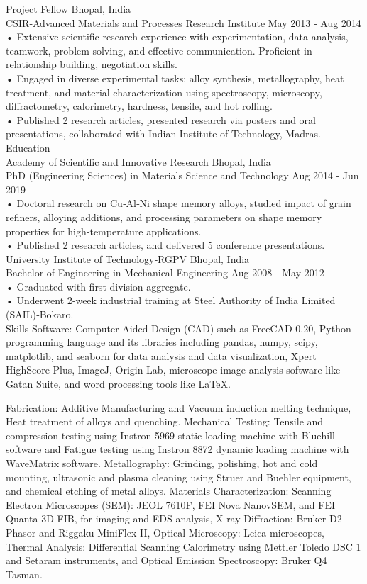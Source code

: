 \documentclass[a4paper]{article}
\begin{document}
Project Fellow Bhopal, India\\
CSIR‑Advanced Materials and Processes Research Institute May 2013 ‑ Aug 2014\\
• Extensive scientific research experience with experimentation, data analysis, teamwork, problem‑solving, and effective
communication. Proficient in relationship building, negotiation skills.\\
• Engaged in diverse experimental tasks: alloy synthesis, metallography, heat treatment, and material characterization
using spectroscopy, microscopy, diffractometry, calorimetry, hardness, tensile, and hot rolling.\\
• Published 2 research articles, presented research via posters and oral presentations, collaborated with Indian Institute
of Technology, Madras.\\

Education\\
Academy of Scientific and Innovative Research Bhopal, India\\
PhD (Engineering Sciences) in Materials Science and Technology Aug 2014 ‑ Jun 2019\\
• Doctoral research on Cu‑Al‑Ni shape memory alloys, studied impact of grain refiners, alloying additions, and processing
parameters on shape memory properties for high‑temperature applications.\\
• Published 2 research articles, and delivered 5 conference presentations.\\

University Institute of Technology‑RGPV Bhopal, India\\
Bachelor of Engineering in Mechanical Engineering Aug 2008 ‑ May 2012\\
• Graduated with first division aggregate.\\
• Underwent 2‑week industrial training at Steel Authority of India Limited (SAIL)‑Bokaro.\\

Skills
Software: Computer‑Aided Design (CAD) such as FreeCAD 0.20, Python programming language and its libraries including
pandas, numpy, scipy, matplotlib, and seaborn for data analysis and data visualization, Xpert HighScore Plus,
ImageJ, Origin Lab, microscope image analysis software like Gatan Suite, and word processing tools like LaTeX.

Fabrication: Additive Manufacturing and Vacuum induction melting technique, Heat treatment of alloys and quenching.
Mechanical Testing: Tensile and compression testing using Instron 5969 static loading machine with Bluehill software
and Fatigue testing using Instron 8872 dynamic loading machine with WaveMatrix software.
Metallography: Grinding, polishing, hot and cold mounting, ultrasonic and plasma cleaning using Struer and Buehler
equipment, and chemical etching of metal alloys.
Materials Characterization: Scanning Electron Microscopes (SEM): JEOL 7610F, FEI Nova NanovSEM, and FEI Quanta
3D FIB, for imaging and EDS analysis, X‑ray Diffraction: Bruker D2 Phasor and Riggaku MiniFlex II, Optical Microscopy:
Leica microscopes, Thermal Analysis: Differential Scanning Calorimetry using Mettler Toledo DSC 1 and Setaram instruments,
and Optical Emission Spectroscopy: Bruker Q4 Tasman.
\end{document}
